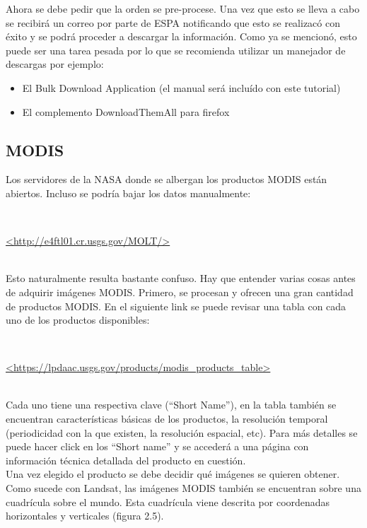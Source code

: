 Ahora se debe pedir que la orden se pre-procese. Una vez que esto se lleva a cabo se recibirá un correo por parte de ESPA notificando que esto se realizacó con éxito y se podrá proceder a descargar la información. Como ya se mencionó, esto puede ser una tarea pesada por lo que se recomienda utilizar un manejador de descargas por ejemplo:

\begin{itemize}
	\item El Bulk Download Application (el manual será incluído con este tutorial)
	\item El complemento DownloadThemAll para firefox
\end{itemize}

\newpage

\subsection{MODIS}

Los servidores de la NASA donde se albergan los productos MODIS están abiertos. Incluso se podría bajar los datos manualmente:

\\
\begin{center}
\url{<http://e4ftl01.cr.usgs.gov/MOLT/>}
\end{center}
\\

Esto naturalmente resulta bastante confuso. Hay que entender varias cosas antes de adquirir imágenes MODIS. Primero, se procesan y ofrecen una gran cantidad de productos MODIS. En el siguiente link se puede revisar una tabla con cada uno de los productos disponibles:

\\
\begin{center}
\url{<https://lpdaac.usgs.gov/products/modis_products_table>}
\end{center}
\\

Cada uno tiene una respectiva clave ("`Short Name"'), en la tabla también se encuentran características básicas de los productos, la resolución temporal (periodicidad con la que existen, la resolución espacial, etc). Para más detalles se puede hacer click en los "`Short name"' y se accederá a una página con información técnica detallada del producto en cuestión. \\

Una vez elegido el producto se debe decidir qué imágenes se quieren obtener. Como sucede con Landsat, las imágenes MODIS también se encuentran sobre una cuadrícula sobre el mundo. Esta cuadrícula viene descrita por coordenadas horizontales y verticales (figura 2.5). 

